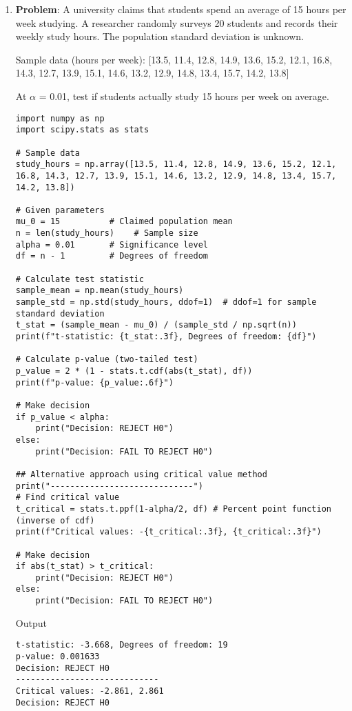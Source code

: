 \begin{enumerate}
    \item \textbf{Problem}: A university claims that students spend an average of 15 hours per week studying. A researcher randomly surveys 20 students and records their weekly study hours. The population standard deviation is unknown.

    Sample data (hours per week): [13.5, 11.4, 12.8, 14.9, 13.6, 15.2, 12.1, 16.8, 14.3, 12.7, 13.9, 15.1, 14.6, 13.2, 12.9, 14.8, 13.4, 15.7, 14.2, 13.8]

    At $\alpha$ = 0.01, test if students actually study 15 hours per week on average.

    \begin{lstlisting}
import numpy as np
import scipy.stats as stats

# Sample data
study_hours = np.array([13.5, 11.4, 12.8, 14.9, 13.6, 15.2, 12.1, 16.8, 14.3, 12.7, 13.9, 15.1, 14.6, 13.2, 12.9, 14.8, 13.4, 15.7, 14.2, 13.8])

# Given parameters
mu_0 = 15          # Claimed population mean
n = len(study_hours)    # Sample size
alpha = 0.01       # Significance level
df = n - 1         # Degrees of freedom

# Calculate test statistic
sample_mean = np.mean(study_hours)
sample_std = np.std(study_hours, ddof=1)  # ddof=1 for sample standard deviation
t_stat = (sample_mean - mu_0) / (sample_std / np.sqrt(n))
print(f"t-statistic: {t_stat:.3f}, Degrees of freedom: {df}")

# Calculate p-value (two-tailed test)
p_value = 2 * (1 - stats.t.cdf(abs(t_stat), df))
print(f"p-value: {p_value:.6f}")

# Make decision
if p_value < alpha:
    print("Decision: REJECT H0")
else:
    print("Decision: FAIL TO REJECT H0")

## Alternative approach using critical value method
print("-----------------------------")
# Find critical value
t_critical = stats.t.ppf(1-alpha/2, df) # Percent point function (inverse of cdf)
print(f"Critical values: -{t_critical:.3f}, {t_critical:.3f}")

# Make decision
if abs(t_stat) > t_critical:
    print("Decision: REJECT H0")
else:
    print("Decision: FAIL TO REJECT H0")
    \end{lstlisting}
    Output
    \begin{lstlisting}
t-statistic: -3.668, Degrees of freedom: 19
p-value: 0.001633
Decision: REJECT H0
-----------------------------
Critical values: -2.861, 2.861
Decision: REJECT H0
    \end{lstlisting}


\end{enumerate}

